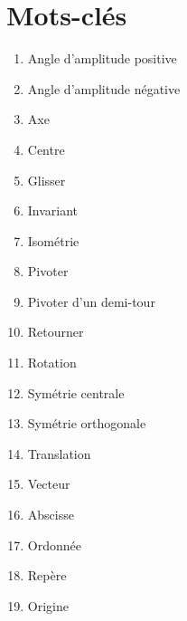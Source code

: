 \documentclass[../../syllabus_1.tex]{subfiles}
\begin{document}
\newpage
\section*{Mots-clés}
\begin{enumerate}[cols=2, label=\textbf{\arabic*.}]
    \item Angle d'amplitude positive
    \item Angle d'amplitude négative
    \item Axe
    \item Centre
    \item Glisser
    \item Invariant
    \item Isométrie
    \item Pivoter
    \item Pivoter d'un demi-tour
    \item Retourner
    \item Rotation
    \item Symétrie centrale
    \item Symétrie orthogonale
    \item Translation
    \item Vecteur
    \item Abscisse
    \item Ordonnée
    \item Repère
    \item Origine
\end{enumerate}
\end{document}
